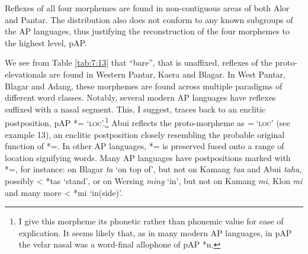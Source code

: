 Reflexes of all four morphemes are found in non-contiguous areas of both Alor and Pantar. The distribution also does not conform to any known subgroups of the AP languages, thus justifying the reconstruction of the four morphemes to the highest level, pAP.

 We see from Table \ref{tab:7:13} that ``bare'', that is unaffixed, reflexes of the proto-elevationals are found in Western Pantar, Kaera and Blagar. In West Pantar, Blagar and  Adang, these morphemes are found across multiple paradigms of different word classes. Notably, several modern AP languages have reflexes suffixed with a nasal segment. This, I suggest, traces back to an enclitic postposition, pAP *={\ng} `\textsc{loc}'.\footnote{I give this morpheme its phonetic rather than phonemic value for ease of explication. It seems likely that, as in many modern AP languages, in pAP the velar nasal was a word-final allophone of pAP *n.}  Abui reflects the proto-morpheme as \textit{=}\textit{{\ng}} `\textsc{loc}' (see example 13), an enclitic postposition closely resembling the probable original function of *={\ng}. In other AP languages, *={\ng} is preserved fused onto a range of location signifying words. Many AP languages have postpositions marked with *={\ng}, for instance: on Blagar \textit{ta}\textit{{\ng}} `on top of', but not on Kamang \textit{taa} and Abui \textit{taha}, possibly {\textless} *tas `stand', or on Wersing \textit{ming} `in', but not on Kamang \textit{mi}, Klon \textit{mi} and many more {\textless} *mi `in(side)'. 


